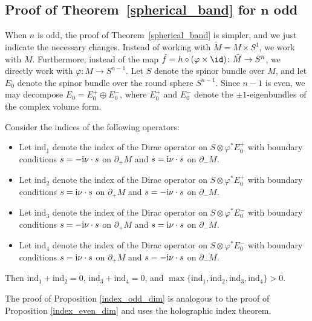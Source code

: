 \subsection[Proof of Theorem~\ref{spherical_band} for n odd]{Proof of Theorem~\ref{spherical_band} for $\boldsymbol{n}$ odd}

When $n$ is odd, the proof of Theorem~\ref{spherical_band} is simpler, and we just indicate the necessary changes.
Instead of working with $\tilde{M} = M \times S^1$, we work with $M$.
Furthermore, instead of the map $\tilde{f} = h \circ (\varphi \times \id)\colon \tilde{M} \to S^n$, we directly work with $\varphi\colon M \to S^{n-1}$.
Let $S$ denote the spinor bundle over $M$, and let $E_0$ denote the spinor bundle over the round sphere $S^{n-1}$.
Since $n-1$ is even, we may decompose $E_0 = E_0^+ \oplus E_0^-$, where $E_0^+$ and $E_0^-$ denote the $\pm 1$-eigenbundles of the complex volume form.

\begin{Proposition}
\label{index_odd_dim}
Consider the indices of the following operators:
\begin{itemize}\itemsep=0pt
\item Let $\mathrm{ind}_1$ denote the index of the Dirac operator on $S \otimes \varphi^* E_0^+$ with boundary conditions $s = -{\rm i} \nu \cdot s$ on $\partial_+ M$ and $s = {\rm i} \nu \cdot s$ on $\partial_- M$.
\item Let $\mathrm{ind}_2$ denote the index of the Dirac operator on $S \otimes \varphi^* E_0^+$ with boundary conditions $s = {\rm i} \nu \cdot s$ on $\partial_+ M$ and $s = -{\rm i} \nu \cdot s$ on $\partial_- M$.
\item Let $\mathrm{ind}_3$ denote the index of the Dirac operator on $S \otimes \varphi^* E_0^-$ with boundary conditions $s = -{\rm i} \nu \cdot s$ on $\partial_+ M$ and $s = {\rm i} \nu \cdot s$ on $\partial_- M$.
\item Let $\mathrm{ind}_4$ denote the index of the Dirac operator on $S \otimes \varphi^* E_0^-$ with boundary conditions $s = {\rm i} \nu \cdot s$ on $\partial_+ M$ and $s = -{\rm i} \nu \cdot s$ on $\partial_- M$.
\end{itemize}
Then $\mathrm{ind}_1+\mathrm{ind}_2=0$, $\mathrm{ind}_3+\mathrm{ind}_4=0$, and $\max \{\mathrm{ind}_1,\mathrm{ind}_2, \mathrm{ind}_3, \mathrm{ind}_4\} > 0$.
\end{Proposition}

The proof of Proposition \ref{index_odd_dim} is analogous to the proof of Proposition \ref{index_even_dim} and uses the holographic index theorem.

